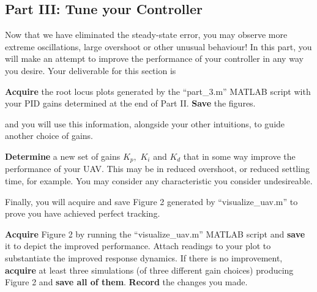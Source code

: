 \subsection{Part III: Tune your Controller}
Now that we have eliminated the steady-state error, you may observe more extreme oscillations, large overshoot or other unusual behaviour!
In this part, you will make an attempt to improve the performance of your controller in any way you desire.
Your deliverable for this section is
%
\begin{deliverable}[label={del:lab4:p3:1}]
  \textbf{Acquire} the root locus plots generated by the ``part\_3.m'' MATLAB script with your PID gains determined at the end of Part II.
  \textbf{Save} the figures.
\end{deliverable}
%
and you will use this information, alongside your other intuitions, to guide another choice of gains.
%
\begin{deliverable}[label={del:lab4:p3:2}]
  \textbf{Determine} a new set of gains \(K_p,\) \(K_i\) and \(K_d\) that in some way improve the performance of your UAV.
  This may be in reduced overshoot, or reduced settling time, for example.
  You may consider any characteristic you consider undesireable.
\end{deliverable}
%
Finally, you will acquire and save Figure 2 generated by ``visualize\_uav.m'' to prove you have achieved perfect tracking.
%
\begin{deliverable}[label={del:lab4:p3:3}]
  \textbf{Acquire} Figure 2 by running the ``visualize\_uav.m'' MATLAB script and \textbf{save} it to depict the improved performance. Attach readings to your plot to substantiate the improved response dynamics.
  If there is no improvement, \textbf{acquire} at least three simulations (of three different gain choices) producing Figure 2 and \textbf{save all of them}. \textbf{Record} the changes you made.
\end{deliverable}
%
